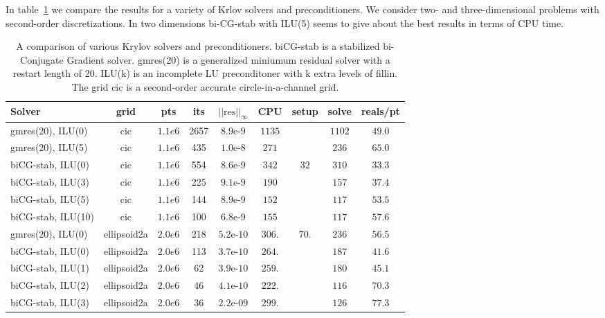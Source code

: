 In table~\ref{tab:krylovSolvers} we compare the results for a variety of Krlov solvers and preconditioners.
We consider two- and three-dimensional problems with second-order discretizations.
In two dimensions bi-CG-stab with ILU(5) seems to give about the best results in terms of CPU time.


\newcommand{\maxNorm}[1]{\vert\vert #1 \vert\vert_\infty}
\newcommand{\maxRes}{\maxNorm{\mbox{res}}}

\begin{table}[hbt]
\begin{center}
\begin{tabular}{|l|c|c|c|c|c|c|c|c|} \hline 
 Solver             & grid     & pts     & its   & $\maxRes$   & CPU    &  setup & solve  & reals/pt\\   \hline 
 gmres(20), ILU(0)  & cic      & $1.1e6$ & 2657  & $8.9$e-$9$  &$1135$  &$    $  &$1102$  & $49.0$    \\
 gmres(20), ILU(5)  & cic      & $1.1e6$ &  435  & $1.0$e-$8$  &$ 271$  &$    $  &$ 236$  & $65.0$    \\
 biCG-stab, ILU(0)  & cic      & $1.1e6$ &  554  & $8.6$e-$9$  & $342$  &  $32$  & $310$  & $33.3$    \\
 biCG-stab, ILU(3)  & cic      & $1.1e6$ &  225  & $9.1$e-$9$  & $190$  &  $  $  & $157$  & $37.4$    \\
 biCG-stab, ILU(5)  & cic      & $1.1e6$ &  144  & $8.9$e-$9$  & $152$  &  $  $  & $117$  & $53.5$    \\
 biCG-stab, ILU(10) & cic      & $1.1e6$ &  100  & $6.8$e-$9$  & $155$  &  $  $  & $117$  & $57.6$    \\ \hline 
%						   	       
 gmres(20), ILU(0) & ellipsoid2a& $2.0e6$ &  218  & $5.2$e-$10$ &$306.$  &$70. $  &$236$   & $56.5$    \\
 biCG-stab, ILU(0) & ellipsoid2a& $2.0e6$ &  113  & $3.7$e-$10$ &$264.$  &  $  $  &$187$   & $ 41.6$    \\
 biCG-stab, ILU(1) & ellipsoid2a& $2.0e6$ &   62  & $3.9$e-$10$ &$259.$  &  $  $  &$180$   & $ 45.1$    \\
 biCG-stab, ILU(2) & ellipsoid2a& $2.0e6$ &   46  & $4.1$e-$10$ &$222.$  &  $  $  &$116$   & $ 70.3$    \\
 biCG-stab, ILU(3) & ellipsoid2a& $2.0e6$ &   36  & $2.2$e-$09$ &$299.$  &  $  $  &$126$   & $ 77.3$    \\
\hline 
\end{tabular}
\end{center}
\caption{A comparison of various Krylov solvers and preconditioners. biCG-stab is a stabilized bi-Conjugate Gradient
solver. gmres(20) is a generalized miniumum residual solver with a restart length of 20. ILU(k) is an
incomplete LU preconditoner with k extra levels of fillin. The grid cic is a second-order accurate circle-in-a-channel
grid.}
\label{tab:krylovSolvers} 
\end{table}



